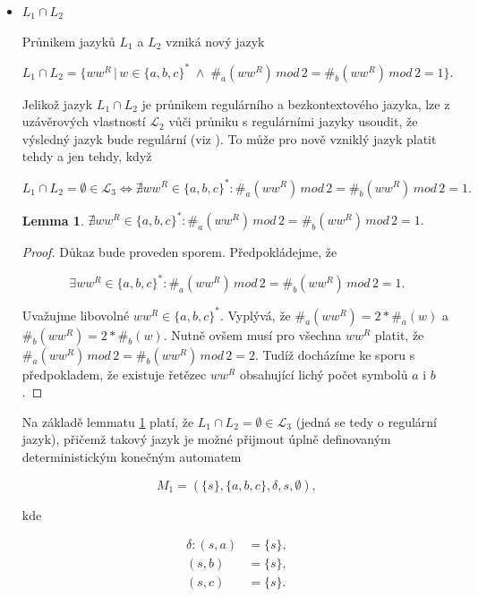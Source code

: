 \documentclass[a4paper, 12pt]{article}
\theoremstyle{definition}
\theoremstyle{definition}
\theoremstyle{definition}
\newtheorem{lemma}[theorem]{Lemma}
\theoremstyle{remark}
\begin{document}
\begin{itemize}
    \item $L_1 \cap L_2$

    Průnikem jazyků $L_1$ a $L_2$ vzniká nový jazyk 
    
    $$L_1 \cap L_2 = \{ww^R \, | \, w \in \{a,b,c\}^\ast \; \wedge \; \#_a(ww^R) \, mod \, 2 = \#_b(ww^R) \, mod \, 2 = 1\}.$$

    Jelikož jazyk $L_1 \cap L_2$ je průnikem regulárního a bezkontextového jazyka, lze z uzávěrových vlastností $\mathcal{L}_2$ vůči průniku s regulárními jazyky usoudit, že výsledný jazyk bude regulární (viz \cite{handbook}). To může pro nově vzniklý jazyk platit tehdy a jen tehdy, když
    
    $$L_1 \cap L_2 = \emptyset \in \mathcal{L}_3 \iff \nexists ww^R \in \{a, b, c\}^\ast: \#_a(ww^R) \, mod \, 2 = \#_b(ww^R) \, mod \, 2 = 1.$$

    \begin{lemma}
        \label{lemma1}
        $\nexists ww^R \in \{a, b, c\}^\ast: \#_a(ww^R) \, mod \, 2 = \#_b(ww^R) \, mod \, 2 = 1.$
    \end{lemma}

    \begin{proof}
        Důkaz bude proveden sporem. Předpokládejme, že
        
        $$\exists ww^R \in \{a, b, c\}^\ast: \#_a(ww^R) \, mod \, 2 = \#_b(ww^R) \, mod \, 2 = 1.$$

        Uvažujme libovolné $ww^R \in \{a,b,c\}^\ast$. Vyplývá, že $\#_a(ww^R) = 2 * \#_a(w)$ a $\#_b(ww^R) = 2 * \#_b(w)$. Nutně ovšem musí pro všechna $ww^R$ platit, že $\#_a(ww^R) \, mod \, 2 = \#_b(ww^R) \, mod \, 2 = 2$. Tudíž docházíme ke sporu s předpokladem, že existuje řetězec $ww^R$ obsahující lichý počet symbolů $a$ i $b$.
    \end{proof}

    Na základě lemmatu \ref{lemma1} platí, že $L_1 \cap L_2 = \emptyset \in \mathcal{L}_3$ (jedná se tedy o regulární jazyk), přičemž takový jazyk je možné přijmout úplně definovaným deterministickým konečným automatem

    $$M_1 = (\{s\}, \{a,b,c\}, \delta, s, \emptyset),$$

    kde

    \begin{align*}
        \delta: (s, a) &= \{s\}, \\
        (s, b) &= \{s\}, \\
        (s, c) &= \{s\}. \\            
    \end{align*}
    

\end{itemize}
\end{document}
